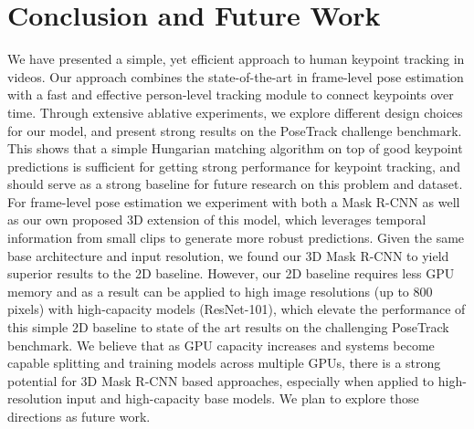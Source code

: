 \documentclass[10pt,twocolumn,letterpaper]{article}
\newcommand{\MODEL}[0]{3D Mask R-CNN}
\begin{document}
 
\section{Conclusion and Future Work}

We have presented a simple, yet efficient approach to human keypoint tracking in videos. Our approach combines the state-of-the-art in frame-level pose estimation with a fast and effective person-level tracking module to connect keypoints over time. Through extensive ablative experiments, we explore
different design choices for our model, and present strong results on the PoseTrack challenge benchmark.
This shows that a simple Hungarian matching algorithm on top of good keypoint predictions is sufficient for getting strong performance for
keypoint tracking, and should serve as a strong baseline for future research on this problem and dataset. For frame-level pose estimation we experiment with both a Mask R-CNN as well as our own proposed 3D extension of this model, which leverages temporal information from small clips to generate more robust predictions. Given the same base architecture and input resolution, we found our \MODEL{} to yield superior results to the 2D baseline. 
However, our 2D baseline requires less GPU memory and as a result can be applied to high image resolutions (up to 800 pixels) with high-capacity models (ResNet-101), which elevate the performance of this simple 2D baseline to state of the art results on the challenging PoseTrack benchmark. 
We believe that as GPU capacity increases and systems become capable splitting and training models across multiple GPUs, there is a strong
potential for \MODEL{} based approaches, especially when applied to high-resolution input and high-capacity base models. We plan to explore those directions as future work.


 \fi

{\small


}
\end{document}
